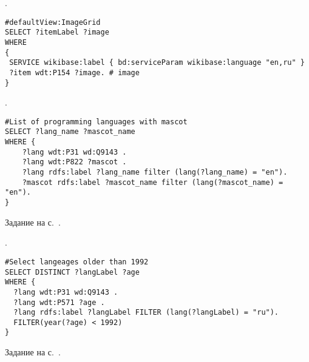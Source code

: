 \begin{task}
    \label{answer:prog_lang_2}
    . 
	\begin{lstlisting}[language=SPARQL, caption={{\href{https://w.wiki/v4U}{Логотипы языков программирования}}\protect\footnotemark}, label=lst:prog_lang_answer_1]
#defaultView:ImageGrid
SELECT ?itemLabel ?image
WHERE
{
 SERVICE wikibase:label { bd:serviceParam wikibase:language "en,ru" }
 ?item wdt:P154 ?image. # image
}
	\end{lstlisting}

\end{task}

\begin{task}
    \label{answer:prog_langs_4}
    . 
	\begin{lstlisting}[language=SPARQL, caption={{\href{https://w.wiki/v4e}{<<Персонажи-талисманы>> языков программирования}}\protect\footnotemark}, label=lst:prog_lang_answer_4]
#List of programming languages with mascot
SELECT ?lang_name ?mascot_name
WHERE {
    ?lang wdt:P31 wd:Q9143 .
    ?lang wdt:P822 ?mascot .
    ?lang rdfs:label ?lang_name filter (lang(?lang_name) = "en").
    ?mascot rdfs:label ?mascot_name filter (lang(?mascot_name) = "en").
}
	\end{lstlisting}
    
    \small{Задание на с.~\pageref{prog_lang_test}.}
\end{task}

\begin{task}
    \label{answer:prog_langs_5}
    . 
	\begin{lstlisting}[language=SPARQL, caption={{\href{https://w.wiki/v4f}{Языки программирования, старше 1992 года}}\protect\footnotemark}, label=lst:prog_lang_answer_5]
#Select langeages older than 1992
SELECT DISTINCT ?langLabel ?age
WHERE {
  ?lang wdt:P31 wd:Q9143 .
  ?lang wdt:P571 ?age .
  ?lang rdfs:label ?langLabel FILTER (lang(?langLabel) = "ru").
  FILTER(year(?age) < 1992)
}
	\end{lstlisting}
    
    \small{Задание на с.~\pageref{prog_lang_test}.}
\end{task}

